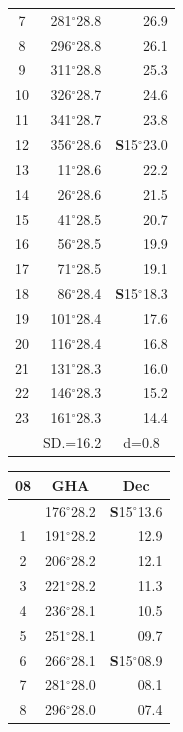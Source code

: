 \documentclass[10pt, a4paper]{report}
\begin{document}
\begin{scriptsize}
\begin{tabular*}{0.2\textwidth}[t]{@{\extracolsep{\fill}}|c|rr|}
7 & 281$^\circ$28.8 & 26.9\\
8 & 296$^\circ$28.8 & 26.1\\
9 & 311$^\circ$28.8 & \raisebox{0.24ex}{\boldmath$\cdot$~\boldmath$\cdot$~~}25.3\\
10 & 326$^\circ$28.7 & 24.6\\
11 & 341$^\circ$28.7 & 23.8\\[2Pt]
12 & 356$^\circ$28.6 & \textbf{S}15$^\circ$23.0\\
13 & 11$^\circ$28.6 & 22.2\\
14 & 26$^\circ$28.6 & 21.5\\
15 & 41$^\circ$28.5 & \raisebox{0.24ex}{\boldmath$\cdot$~\boldmath$\cdot$~~}20.7\\
16 & 56$^\circ$28.5 & 19.9\\
17 & 71$^\circ$28.5 & 19.1\\[2Pt]
18 & 86$^\circ$28.4 & \textbf{S}15$^\circ$18.3\\
19 & 101$^\circ$28.4 & 17.6\\
20 & 116$^\circ$28.4 & 16.8\\
21 & 131$^\circ$28.3 & \raisebox{0.24ex}{\boldmath$\cdot$~\boldmath$\cdot$~~}16.0\\
22 & 146$^\circ$28.3 & 15.2\\
23 & 161$^\circ$28.3 & 14.4\\
\hline
\rule{0pt}{2.4ex} & \multicolumn{1}{c}{SD.=16.2} & \multicolumn{1}{c|}{d=0.8}\\
\hline
\end{tabular*}\noindent
\begin{tabular*}{0.2\textwidth}[t]{@{\extracolsep{\fill}}|c|rr|}
\hline
\multicolumn{1}{|c|}{\rule{0pt}{2.6ex}\textbf{08}} & \multicolumn{1}{c}{\textbf{GHA}} & \multicolumn{1}{c|}{\textbf{Dec}}\\
\hline\rule{0pt}{2.6ex}\noindent
0 & 176$^\circ$28.2 & \textbf{S}15$^\circ$13.6\\
1 & 191$^\circ$28.2 & 12.9\\
2 & 206$^\circ$28.2 & 12.1\\
3 & 221$^\circ$28.2 & \raisebox{0.24ex}{\boldmath$\cdot$~\boldmath$\cdot$~~}11.3\\
4 & 236$^\circ$28.1 & 10.5\\
5 & 251$^\circ$28.1 & 09.7\\[2Pt]
6 & 266$^\circ$28.1 & \textbf{S}15$^\circ$08.9\\
7 & 281$^\circ$28.0 & 08.1\\
8 & 296$^\circ$28.0 & 07.4\\

\end{tabular*}
\end{scriptsize}
\end{document}

